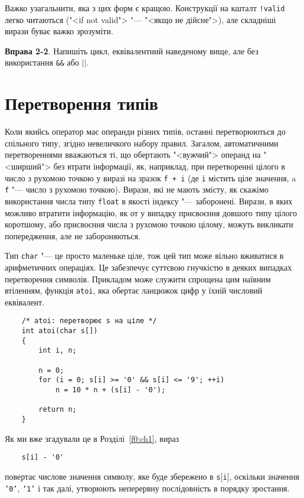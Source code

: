 \documentclass[a4paper,12pt]{book}
\begin{document}
  Важко узагальнити, яка з цих форм є кращою. Конструкції на кшталт \texttt{!valid} легко
  читаються ("<if not valid"> "--- "<якщо не дійсне">), але
  складніші вирази буває важко зрозуміти.

  \textbf{Вправа 2-2}. Напишіть цикл, еквівалентний наведеному вище, але без використання
  \texttt{\&\&} або \texttt{\mbox{$|$}\mbox{$|$}}.

\section{Перетворення типів}

\label{f0:ch2.7}
  Коли якийсь оператор має операнди різних типів, останні перетворюються до спільного
  типу, згідно невеличкого набору правил. Загалом, автоматичними перетвореннями вважаються
  ті, що обертають "<вужчий"> операнд на "<ширший"> без втрати
  інформації, як, наприклад, при перетворенні цілого в число з рухомою точкою у виразі на
  зразок \texttt{f + i} (де \texttt{i} містить ціле значення, a \texttt{f} "--- число з
  рухомою точкою). Вирази, які не мають змісту, як скажімо використання числа типу
  \texttt{float} в якості індексу "--- заборонені. Вирази, в яких можливо втратити
  інформацію, як от у випадку присвоєння довшого типу цілого коротшому, або присвоєння
  числа з рухомою точкою цілому, можуть викликати попередження, але не забороняються.

  Тип \texttt{char} "--- це просто маленьке ціле, тож цей тип може вільно вживатися в
  арифметичних операціях. Це забезпечує суттєвою гнучкістю в деяких випадках перетворення
  символів. Прикладом може служити спрощена цим наївним втіленням, функція \texttt{atoi},
  яка обертає ланцюжок цифр у їхній числовий еквівалент.
  \begin{verbatim}
    /* atoi: перетворює s на ціле */
    int atoi(char s[])
    {
        int i, n;

        n = 0;
        for (i = 0; s[i] >= '0' && s[i] <= '9'; ++i)
            n = 10 * n + (s[i] - '0');

        return n;
    }
  \end{verbatim}

  Як ми вже згадували це в Розділі~\ref{f0:ch1}, вираз
  \begin{verbatim}
    s[i] - '0'
  \end{verbatim}
  повертає числове значення символу, яке буде збережено в \texttt{s\mbox{$[$}i\mbox{$]$}},
  оскільки значення \texttt{'0'}, \texttt{'1'} і так далі, утворюють неперервну
  послідовність в порядку зростання.
  
\end{document}
